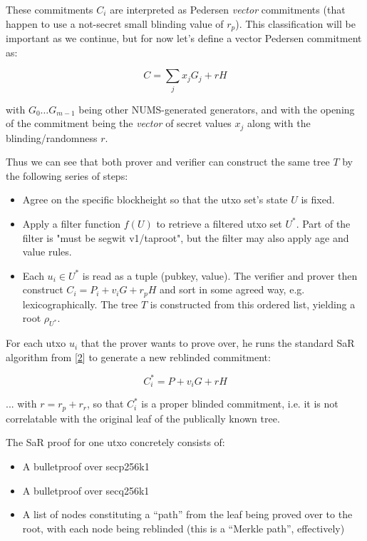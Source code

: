 \documentclass[10pt,a4paper]{article}
\begin{document}
\vspace{5 pt}

These commitments $C_i$ are interpreted as Pedersen \emph{vector} commitments (that happen to use a not-secret small blinding value of $r_p$). This classification will be important as we continue, but for now let's define a vector Pedersen commitment as:

$$C = \sum_j x_j G_j + rH$$

with $G_0 \ldots G_{m-1}$ being other NUMS-generated generators, and with the opening of the commitment being the \emph{vector} of secret values $x_j$ along with the blinding/randomness $r$.

Thus we can see that both prover and verifier can construct the same tree $T$ by the following series of steps:

\begin{itemize}
\item Agree on the specific blockheight so that the utxo set's state $U$ is fixed.
\item Apply a filter function $f(U)$ to retrieve a filtered utxo set ${U^*}$. Part of the filter is "must be segwit v1/taproot", but the filter may also apply age and value rules.
\item Each $u_i \in U^*$ is read as a tuple (pubkey, value). The verifier and prover then construct $C_i = P_i + v_i G + r_pH$ and sort in some agreed way, e.g. lexicographically. The tree $T$ is constructed from this ordered list, yielding a root $\rho_{U^*}$. 
\end{itemize}

For each utxo $u_i$ that the prover wants to prove over, he runs the standard SaR algorithm from {[}\protect\hyperlink{anchor-2}{2}{]} to generate a new reblinded commitment:

$$C_{i}^* = P + v_i G + rH$$

... with $r = r_p + r_r$, so that $C_{i}^*$ is a proper blinded commitment, i.e. it is not correlatable with the original leaf of the publically known tree.

\vspace{5 pt}

The SaR proof for one utxo concretely consists of:

\begin{itemize}
\item A bulletproof over secp256k1
\item A bulletproof over secq256k1
\item A list of nodes constituting a ``path'' from the leaf being proved over to the root, with each node being reblinded (this is a ``Merkle path'', effectively)
\end{itemize}
\end{document}
